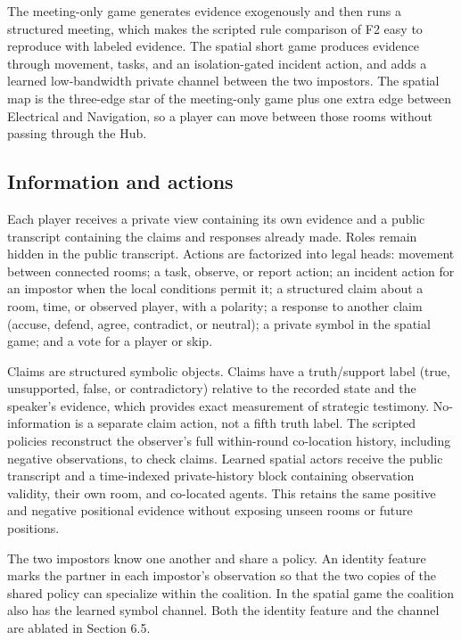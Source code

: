\documentclass[
  12pt,
]{article}
\begin{document}
The meeting-only game generates evidence exogenously and then runs a
structured meeting, which makes the scripted rule comparison of F2 easy
to reproduce with labeled evidence. The spatial short game produces
evidence through movement, tasks, and an isolation-gated incident
action, and adds a learned low-bandwidth private channel between the two
impostors. The spatial map is the three-edge star of the meeting-only
game plus one extra edge between Electrical and Navigation, so a player
can move between those rooms without passing through the Hub.

\FloatBarrier

\subsection{Information and actions}\label{information-and-actions}

Each player receives a private view containing its own evidence and a
public transcript containing the claims and responses already made.
Roles remain hidden in the public transcript. Actions are factorized
into legal heads: movement between connected rooms; a task, observe, or
report action; an incident action for an impostor when the local
conditions permit it; a structured claim about a room, time, or observed
player, with a polarity; a response to another claim (accuse, defend,
agree, contradict, or neutral); a private symbol in the spatial game;
and a vote for a player or skip.

Claims are structured symbolic objects. Claims have a truth/support
label (true, unsupported, false, or contradictory) relative to the
recorded state and the speaker's evidence, which provides exact
measurement of strategic testimony. No-information is a separate claim
action, not a fifth truth label. The scripted policies reconstruct the
observer's full within-round co-location history, including negative
observations, to check claims. Learned spatial actors receive the public
transcript and a time-indexed private-history block containing
observation validity, their own room, and co-located agents. This
retains the same positive and negative positional evidence without
exposing unseen rooms or future positions.

The two impostors know one another and share a policy. An identity
feature marks the partner in each impostor's observation so that the two
copies of the shared policy can specialize within the coalition. In the
spatial game the coalition also has the learned symbol channel. Both the
identity feature and the channel are ablated in Section 6.5.
\end{document}
